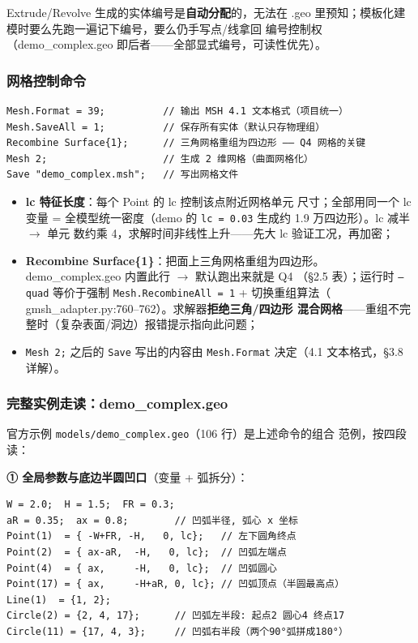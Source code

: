 \documentclass[12pt,a4paper]{ctexart}
\newcommand{\fem}{\Verb}
\begin{document}
Extrude/Revolve 生成的实体编号是\textbf{自动分配}的，无法在 .geo
里预知；模板化建模时要么先跑一遍记下编号，要么仍手写点/线拿回
编号控制权（demo\_complex.geo 即后者——全部显式编号，可读性优先）。

\subsubsection{网格控制命令}

\begin{lstlisting}
Mesh.Format = 39;          // 输出 MSH 4.1 文本格式（项目统一）
Mesh.SaveAll = 1;          // 保存所有实体（默认只存物理组）
Recombine Surface{1};      // 三角网格重组为四边形 —— Q4 网格的关键
Mesh 2;                    // 生成 2 维网格（曲面网格化）
Save "demo_complex.msh";   // 写出网格文件
\end{lstlisting}

\begin{itemize}[leftmargin=*]
  \item \textbf{lc 特征长度}：每个 Point 的 lc 控制该点附近网格单元
        尺寸；全部用同一个 lc 变量 = 全模型统一密度（demo 的
        \fem|lc = 0.03| 生成约 1.9 万四边形）。lc 减半 $\rightarrow$ 单元
        数约乘 4，求解时间非线性上升——先大 lc 验证工况，再加密；
  \item \textbf{Recombine Surface\{1\}}：把面上三角网格重组为四边形。
        demo\_complex.geo 内置此行 $\rightarrow$ 默认跑出来就是 Q4
        （§2.5 表）；运行时 \texttt{--quad} 等价于强制
        \texttt{Mesh.RecombineAll = 1} + 切换重组算法（
        gmsh\_adapter.py:760--762）。求解器\textbf{拒绝三角/四边形
        混合网格}——重组不完整时（复杂表面/洞边）报错提示指向此问题；
  \item \fem|Mesh 2;| 之后的 \fem|Save| 写出的内容由
        \fem|Mesh.Format| 决定（4.1 文本格式，§3.8 详解）。
\end{itemize}

\subsubsection{完整实例走读：demo\_complex.geo}

官方示例 \fem|models/demo_complex.geo|（106 行）是上述命令的组合
范例，按四段读：

\textbf{① 全局参数与底边半圆凹口}（变量 + 弧拆分）：

\begin{lstlisting}
W = 2.0;  H = 1.5;  FR = 0.3;
aR = 0.35;  ax = 0.8;        // 凹弧半径, 弧心 x 坐标
Point(1)  = { -W+FR, -H,   0, lc};   // 左下圆角终点
Point(2)  = { ax-aR,  -H,   0, lc};  // 凹弧左端点
Point(4)  = { ax,     -H,   0, lc};  // 凹弧圆心
Point(17) = { ax,     -H+aR, 0, lc}; // 凹弧顶点（半圆最高点）
Line(1)  = {1, 2};
Circle(2) = {2, 4, 17};      // 凹弧左半段: 起点2 圆心4 终点17
Circle(11) = {17, 4, 3};     // 凹弧右半段（两个90°弧拼成180°）
\end{lstlisting}
\end{document}
